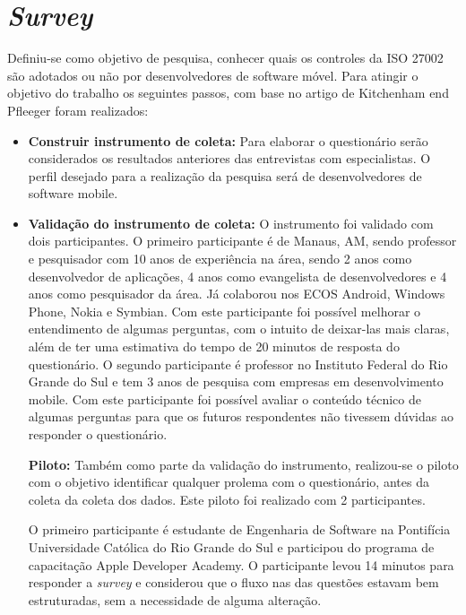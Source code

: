  
 
 






\section{\textbf{\textit{Survey}}} Definiu-se como objetivo de pesquisa, conhecer quais os controles da ISO 27002 são adotados ou não por desenvolvedores de software móvel. Para atingir o objetivo do trabalho os seguintes passos, com base no artigo de Kitchenham end Pfleeger \cite{pfleeger2001principles} foram realizados:
\begin{itemize}

\item \textbf{Construir instrumento de coleta:} Para elaborar o questionário serão considerados os resultados anteriores das entrevistas com especialistas. O perfil desejado para a realização da pesquisa será de desenvolvedores de software mobile.

\item \textbf{Validação do instrumento de coleta:} O instrumento foi validado com dois participantes. O primeiro participante é de Manaus, AM, sendo professor e pesquisador com 10 anos de experiência na área, sendo 2 anos como desenvolvedor de aplicações, 4 anos como evangelista de desenvolvedores e 4 anos como pesquisador da área. Já colaborou nos ECOS Android, Windows Phone, Nokia e Symbian. Com este participante foi possível  melhorar o entendimento de algumas perguntas, com o intuito de deixar-las mais claras, além de ter uma estimativa do tempo de 20 minutos de resposta do questionário. O segundo participante é professor no Instituto Federal do Rio Grande do Sul e tem 3 anos de pesquisa com empresas em desenvolvimento mobile. Com este participante foi possível avaliar o conteúdo técnico de algumas perguntas para que os futuros respondentes não tivessem dúvidas ao responder o questionário.



 \textbf{Piloto:} Também como parte da validação do instrumento, realizou-se o piloto com o objetivo identificar qualquer prolema com o questionário, antes da coleta da coleta dos dados. Este piloto foi realizado com 2 participantes. 
 
 O primeiro participante é estudante de Engenharia de Software na Pontifícia Universidade Católica do Rio Grande do Sul e participou do programa de capacitação Apple Developer Academy. O participante levou  14 minutos para responder a \textit{survey} e considerou que o fluxo nas das questões estavam bem estruturadas, sem a necessidade de alguma alteração.
 

\end{itemize}
